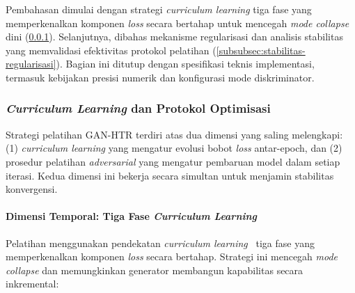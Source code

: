 Pembahasan dimulai dengan strategi \textit{curriculum learning} tiga fase yang memperkenalkan komponen \textit{loss} secara bertahap untuk mencegah \textit{mode collapse} dini (\ref{subsubsec:curriculum-learning}). Selanjutnya, dibahas mekanisme regularisasi dan analisis stabilitas yang memvalidasi efektivitas protokol pelatihan (\ref{subsubsec:stabilitas-regularisasi}). Bagian ini ditutup dengan spesifikasi teknis implementasi, termasuk kebijakan presisi numerik dan konfigurasi mode diskriminator.

\subsubsection{\textit{Curriculum Learning} dan Protokol Optimisasi}
\label{subsubsec:curriculum-learning}

Strategi pelatihan GAN-HTR terdiri atas dua dimensi yang saling melengkapi: (1) \textit{curriculum learning} yang mengatur evolusi bobot \textit{loss} antar-epoch, dan (2) prosedur pelatihan \textit{adversarial} yang mengatur pembaruan model dalam setiap iterasi. Kedua dimensi ini bekerja secara simultan untuk menjamin stabilitas konvergensi.

\paragraph{Dimensi Temporal: Tiga Fase \textit{Curriculum Learning}}

Pelatihan menggunakan pendekatan \textit{curriculum learning}~\parencite{bengio2009} tiga fase yang memperkenalkan komponen \textit{loss} secara bertahap. Strategi ini mencegah \textit{mode collapse} dan memungkinkan generator membangun kapabilitas secara inkremental:

